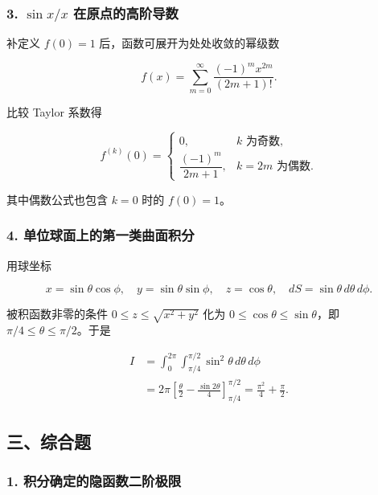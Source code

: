 \documentclass[11pt,fontset=fandol]{ctexart}
\begin{document}
\subsubsection{\texorpdfstring{3. \(\sin x/x\)
在原点的高阶导数}{3. \textbackslash sin x/x 在原点的高阶导数}}\label{sin-xx-ux5728ux539fux70b9ux7684ux9ad8ux9636ux5bfcux6570}

补定义 \(f(0)=1\) 后，函数可展开为处处收敛的幂级数

\[
f(x)=\sum_{m=0}^\infty\frac{(-1)^m x^{2m}}{(2m+1)!}.
\]

比较 Taylor 系数得

\[
\boxed{f^{(k)}(0)=
\begin{cases}
0,&k\text{ 为奇数},\\[2pt]
\dfrac{(-1)^m}{2m+1},&k=2m\text{ 为偶数}.
\end{cases}}
\]

其中偶数公式也包含 \(k=0\) 时的 \(f(0)=1\)。

\subsubsection{4.
单位球面上的第一类曲面积分}\label{ux5355ux4f4dux7403ux9762ux4e0aux7684ux7b2cux4e00ux7c7bux66f2ux9762ux79efux5206}

用球坐标

\[
x=\sin\theta\cos\phi,\quad y=\sin\theta\sin\phi,\quad
z=\cos\theta,\quad dS=\sin\theta\,d\theta\,d\phi.
\]

被积函数非零的条件 \(0\le z\le\sqrt{x^2+y^2}\) 化为
\(0\le\cos\theta\le\sin\theta\)，即 \(\pi/4\le\theta\le\pi/2\)。于是

\[
\begin{aligned}
I&=\int_0^{2\pi}\int_{\pi/4}^{\pi/2}\sin^2\theta\,d\theta\,d\phi\\
&=2\pi\left[\frac\theta2-\frac{\sin2\theta}{4}\right]_{\pi/4}^{\pi/2}
=\boxed{\frac{\pi^2}{4}+\frac\pi2}.
\end{aligned}
\]

\subsection{三、综合题}\label{ux4e09ux7efcux5408ux9898}

\subsubsection{1.
积分确定的隐函数二阶极限}\label{ux79efux5206ux786eux5b9aux7684ux9690ux51fdux6570ux4e8cux9636ux6781ux9650}
\end{document}
